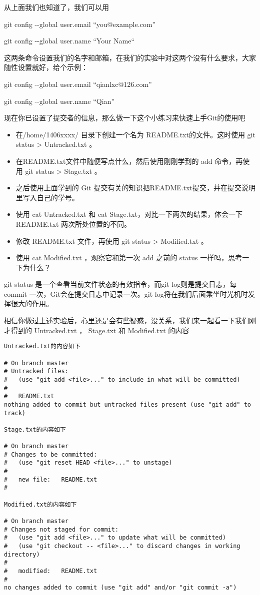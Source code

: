 \begin{note}
从上面我们也知道了，我们可以用  

  git config -{}-global user.email “you@example.com”
  
  git config -{}-global user.name “Your Name“
  
这两条命令设置我们的名字和邮箱，在我们的实验中对这两个没有什么要求，大家随性设置就好，给个示例：

  git config -{}-global user.email “qianlxc@126.com”
  
  git config -{}-global user.name “Qian”
\end{note}

现在你已设置了提交者的信息，那么做一下这个小练习来快速上手Git的使用吧

\begin{exercise}
	\begin{itemize}
		\item 在/home/1406xxxx/ 目录下创建一个名为 README.txt的文件。这时使用 git status > Untracked.txt 。
		\item 在README.txt文件中随便写点什么，然后使用刚刚学到的 add 命令，再使用 git status > Stage.txt 。
		\item 之后使用上面学到的 Git 提交有关的知识把README.txt提交，并在提交说明里写入自己的学号。
		\item 使用 cat Untracked.txt 和 cat Stage.txt，对比一下两次的结果，体会一下README.txt 两次所处位置的不同。
		\item 修改 README.txt 文件，再使用 git status > Modified.txt 。
		\item 使用 cat Modified.txt ，观察它和第一次 add 之前的 status 一样吗，思考一下为什么？
	\end{itemize}
\end{exercise}

\begin{note}
git status 是一个查看当前文件状态的有效指令，而git log则是提交日志，每commit 一次，Git会在提交日志中记录一次。git log将在我们后面乘坐时光机时发挥很大的作用。
\end{note}

相信你做过上述实验后，心里还是会有些疑惑，没关系，我们来一起看一下我们刚才得到的 Untracked.txt ， Stage.txt 和 Modified.txt 的内容

\begin{verbatim}
Untracked.txt的内容如下

# On branch master
# Untracked files:
#   (use "git add <file>..." to include in what will be committed)
#
#	README.txt
nothing added to commit but untracked files present (use "git add" to track)

Stage.txt的内容如下

# On branch master
# Changes to be committed:
#   (use "git reset HEAD <file>..." to unstage)
#
#	new file:   README.txt
#

Modified.txt的内容如下

# On branch master
# Changes not staged for commit:
#   (use "git add <file>..." to update what will be committed)
#   (use "git checkout -- <file>..." to discard changes in working directory)
#
#	modified:   README.txt
#
no changes added to commit (use "git add" and/or "git commit -a")
\end{verbatim}

